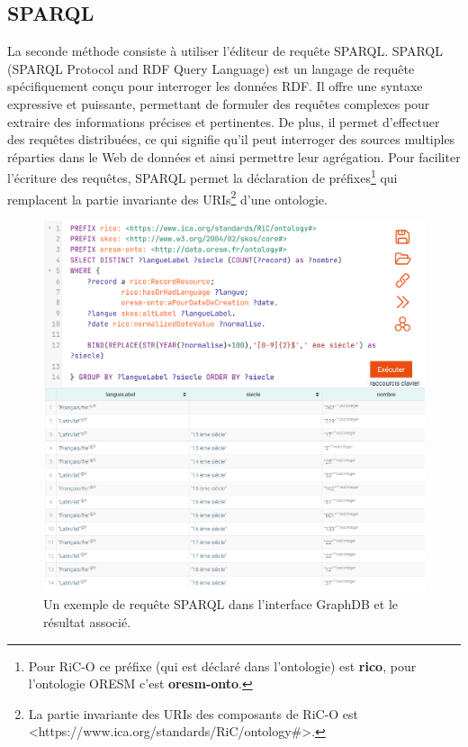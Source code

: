 \subsection{SPARQL}
La seconde méthode consiste à utiliser l'éditeur de requête SPARQL. SPARQL (SPARQL Protocol and RDF Query Language) est un langage de requête spécifiquement conçu pour interroger les données RDF. Il offre une syntaxe expressive et puissante, permettant de formuler des requêtes complexes pour extraire des informations précises et pertinentes. De plus, il permet d'effectuer des requêtes distribuées, ce qui signifie qu'il peut interroger des sources multiples réparties dans le Web de données et ainsi permettre leur agrégation. Pour faciliter l'écriture des requêtes, SPARQL permet la déclaration de préfixes\footnote{Pour RiC-O ce préfixe (qui est déclaré dans l'ontologie) est \textbf{rico}, pour l'ontologie ORESM c'est \textbf{oresm-onto}.} qui remplacent la partie invariante des URIs\footnote{La partie invariante des URIs des composants de RiC-O est <https://www.ica.org/standards/RiC/ontology\#>.} d'une ontologie.
\begin{figure}[!h]
    \centering
    \includegraphics[width=0.95 \linewidth]{images/requete sparl langue resultat.png}
    \caption{Un exemple de requête SPARQL dans l'interface GraphDB et le résultat associé.}
    \label{fig:sparql_requete}
\end{figure}

